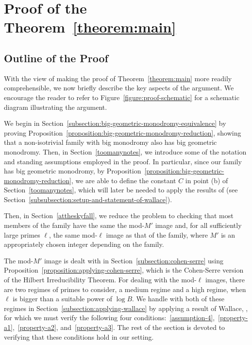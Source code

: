 \section{Proof of the Theorem~\ref{theorem:main}} \label{section:new-proof-of-main-theorem}

\def\arraystretch{0.7}
\subsection{Outline of the Proof}
\label{subsection:outline}

With the view of making the proof of Theorem~\ref{theorem:main} more readily comprehensible, we now briefly describe the key aspects of the argument. We encourage the reader to refer to Figure~\ref{figure:proof-schematic} for a schematic diagram illustrating the argument.

We begin in Section~\ref{subsection:big-geometric-monodromy-equivalence}
by 
proving Proposition~\ref{proposition:big-geometric-monodromy-reduction},
showing 
that a non-isotrivial family with big 
monodromy also has big geometric monodromy.
Then, in Section~\ref{toomanynotes}, we
introduce some of the notation and standing assumptions employed in the proof.
In particular, since our family has big geometric monodromy, by
Proposition~\ref{proposition:big-geometric-monodromy-reduction},
we are able to define the constant $C$ in point (b) of Section~\ref{toomanynotes}, which will later be needed to apply
the results of \cite{scoopdedoo} (see Section~\ref{subsubsection:setup-and-statement-of-wallace}).

Then, in Section~\ref{attheskyfall}, we reduce the problem to
checking that most members of the family have the same
the mod-$M'$ image and, for all sufficiently large primes $\ell$, the same mod-$\ell$ image as that of the family,
where $M'$ is an appropriately chosen integer depending on the family.

The mod-$M'$ image is dealt with in Section~\ref{subsection:cohen-serre}
using Proposition~\ref{proposition:applying-cohen-serre}, which is the Cohen-Serre version of the Hilbert Irreducibility Theorem.
For dealing with the mod-$\ell$ images,
there are two regimes of primes to consider, a medium
regime and a high regime, when $\ell$ is bigger than a suitable power of $\log B$.
We handle with both of these regimes in Section~\ref{subsection:applying-wallace} by applying a result of Wallace, \cite[Theorem 3.9]{scoopdedoo}, for which we must verify the following four conditions:~\ref{assumption-4},~\ref{property-a1},~\ref{property-a2}, and~\ref{property-a3}. The rest of the section is devoted to verifying that these conditions hold in our setting.

